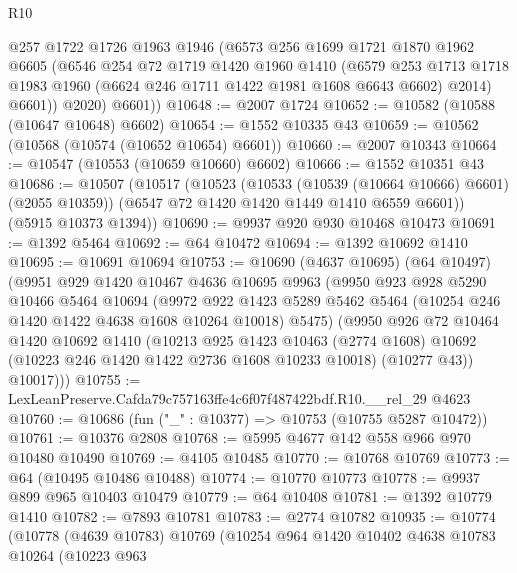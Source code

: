 \begin{lexlean}{R10}
\begin{coremodule}
          @257
          @1722
          @1726
          @1963
          @1946
          (@6573
            @256
            @1699
            @1721
            @1870
            @1962
            @6605
            (@6546
              @254
              @72
              @1719
              @1420
              @1960
              @1410
              (@6579
                @253
                @1713
                @1718
                @1983
                @1960
                (@6624 @246 @1711 @1422 @1981 @1608 @6643 @6602)
                @2014)
              @6601))
          @2020)
        @6601))
@10648 := @2007 @1724
@10652 := @10582 (@10588 (@10647 @10648) @6602)
@10654 := @1552 @10335 @43
@10659 := @10562 (@10568 (@10574 (@10652 @10654) @6601))
@10660 := @2007 @10343
@10664 := @10547 (@10553 (@10659 @10660) @6602)
@10666 := @1552 @10351 @43
@10686 := @10507
    (@10517
      (@10523
        (@10533 (@10539 (@10664 @10666) @6601) (@2055 @10359))
        (@6547 @72 @1420 @1420 @1449 @1410 @6559 @6601))
      (@5915 @10373 @1394))
@10690 := @9937 @920 @930 @10468 @10473
@10691 := @1392 @5464
@10692 := @64 @10472
@10694 := @1392 @10692 @1410
@10695 := @10691 @10694
@10753 := @10690
    (@4637 @10695)
    (@64 @10497)
    (@9951
      @929
      @1420
      @10467
      @4636
      @10695
      @9963
      (@9950
        @923
        @928
        @5290
        @10466
        @5464
        @10694
        (@9972
          @922
          @1423
          @5289
          @5462
          @5464
          (@10254 @246 @1420 @1422 @4638 @1608 @10264 @10018)
          @5475)
        (@9950
          @926
          @72
          @10464
          @1420
          @10692
          @1410
          (@10213
            @925
            @1423
            @10463
            (@2774 @1608)
            @10692
            (@10223 @246 @1420 @1422 @2736 @1608 @10233 @10018)
            (@10277 @43))
          @10017)))
@10755 := LexLeanPreserve.Cafda79c757163ffe4c6f07f487422bdf.R10.__rel_29 @4623
@10760 := @10686 (fun ("_" : @10377) => @10753 (@10755 @5287 @10472))
@10761 := @10376 @2808
@10768 := @5995 @4677 @142 @558 @966 @970 @10480 @10490
@10769 := @4105 @10485
@10770 := @10768 @10769
@10773 := @64 (@10495 @10486 @10488)
@10774 := @10770 @10773
@10778 := @9937 @899 @965 @10403 @10479
@10779 := @64 @10408
@10781 := @1392 @10779 @1410
@10782 := @7893 @10781
@10783 := @2774 @10782
@10935 := @10774
    (@10778
      (@4639 @10783)
      @10769
      (@10254
        @964
        @1420
        @10402
        @4638
        @10783
        @10264
        (@10223
          @963

\end{coremodule}
\end{lexlean}
